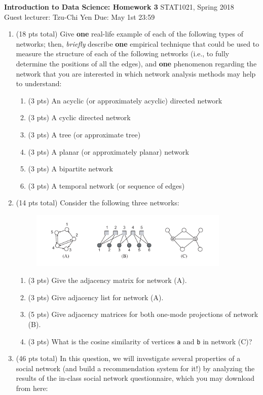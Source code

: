 \documentclass[10pt]{article}
\begin{document}
\noindent
\large\textbf{Introduction to Data Science: Homework 3} \hfill STAT1021, Spring 2018
\\
Guest lecturer: Tzu-Chi Yen
\hfill Due: May 1st 23:59

\begin{enumerate}
	\item{(18 pts total) Give \textbf{one} real-life example of each of the following types of networks; then, {\it briefly} describe \textbf{one} empirical technique that could be used to measure the structure of each of the following networks (i.e., to fully determine the positions of all the edges), and \textbf{one} phenomenon regarding the network that you are interested in which network analysis methods may help to understand:
	\begin{enumerate}
	\item{(3 pts) An acyclic (or approximately acyclic) directed network}
	\item{(3 pts) A cyclic directed network}
	\item{(3 pts) A tree (or approximate tree)}
	\item{(3 pts) A planar (or approximately planar) network}
	\item{(3 pts) A bipartite network}
	\item{(3 pts) A temporal network (or sequence of edges)
	}
	\end{enumerate}
	}
	\item{(14 pts total) Consider the following three networks:
		\begin{figure}[ht]
		\centering
		\includegraphics[width=0.9\textwidth]{fig-1.pdf}	
		\end{figure}
		\begin{enumerate}
			\item{(3 pts) Give the adjacency matrix for network (A).}
			\item{(3 pts) Give adjacency list for network (A).}	
			\item{(5 pts) Give adjacency matrices for both one-mode projections of network (B).}
			\item{(3 pts) What is the cosine similarity of vertices \texttt{a} and \texttt{b} in network (C)?}
		\end{enumerate}
	}
	\item{(46 pts total) In this question, we will investigate several properties of a social network (and build a recommendation system for it!) by analyzing the results of the in-class social network questionnaire, which you may download from here:
	
}
\end{enumerate}
\end{document}
